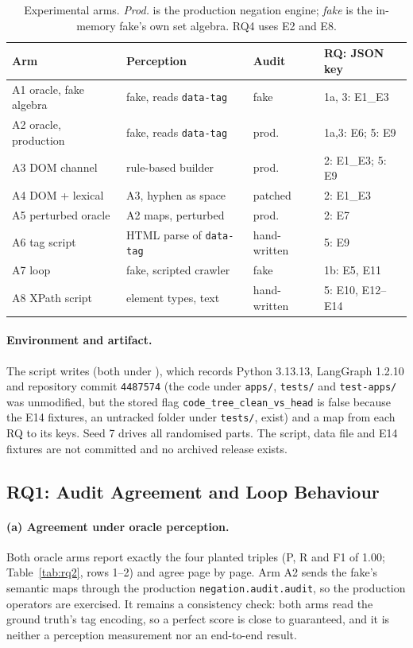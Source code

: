 \begin{table}[tbp]
\caption{Experimental arms. \emph{Prod.} is the production negation engine;
\emph{fake} is the in-memory fake's own set algebra. RQ4 uses E2 and E8.}
\label{tab:arms}
\setlength{\tabcolsep}{2.5pt}
\footnotesize
\begin{tabular}{@{}llll@{}}
\toprule
Arm & Perception & Audit & RQ: JSON key \\
\midrule
A1 oracle, fake algebra & fake, reads \texttt{data-tag} & fake & 1a, 3: E1\_E3 \\
A2 oracle, production & fake, reads \texttt{data-tag} & prod. & 1a,3: E6; 5: E9 \\
A3 DOM channel & rule-based builder & prod. & 2: E1\_E3; 5: E9 \\
A4 DOM + lexical & A3, hyphen as space & patched & 2: E1\_E3 \\
A5 perturbed oracle & A2 maps, perturbed & prod. & 2: E7 \\
A6 tag script & HTML parse of \texttt{data-tag} & hand-written & 5: E9 \\
A7 loop & fake, scripted crawler & fake & 1b: E5, E11 \\
A8 XPath script & element types, text & hand-written & 5: E10, E12--E14 \\
\bottomrule
\end{tabular}
\end{table}

\paragraph{Environment and artifact.}
The script  writes
 (both under ), which records Python
3.13.13, LangGraph 1.2.10 and repository commit \texttt{4487574} (the code
under \texttt{apps/}, \texttt{tests/} and \texttt{test-apps/} was unmodified, but the
stored flag \texttt{code\_tree\_clean\_vs\_head} is false because the E14 fixtures,
an untracked folder under \texttt{tests/}, exist) and a map from each RQ to its keys. Seed 7 drives all
randomised parts. The script, data file and E14 fixtures are not committed and no archived
release exists.

\subsection{RQ1: Audit Agreement and Loop Behaviour}
\label{sec:rq1}

\paragraph{(a) Agreement under oracle perception.}
Both oracle arms report exactly the four planted triples (P, R and F1 of 1.00;
Table~\ref{tab:rq2}, rows 1--2) and agree page by page. Arm A2 sends the fake's
semantic maps through the production \texttt{negation.audit.audit}, so the
production operators are exercised. It remains a consistency check: both arms read the ground truth's tag encoding, so
a perfect score is close to guaranteed, and it is neither a perception measurement
nor an end-to-end result.

